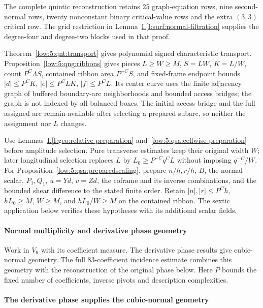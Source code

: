 \documentclass[11pt]{amsart}
\theoremstyle{definition}
\theoremstyle{remark}
\numberwithin{equation}{section}
\newcommand{\partIref}[1]{\hyperref[I:#1]{I.\ref*{I:#1}}}
\begin{document}
The complete quintic reconstruction retains $25$ graph-equation rows, nine second-normal rows, twenty nonconstant binary critical-value rows and the extra $(3,3)$ critical row. The grid restriction in Lemma~\partIref{surf:normal-filtration} supplies the degree-four and degree-two blocks used in that proof.

Theorem~\ref{low:5:qnt:transport} gives polynomial signed characteristic transport. Proposition~\ref{low:5:qng:ribbons} gives pieces $L\ge W\ge M$, $S=LW$, $K=L/W$, count $P^C\Lambda S$, contained ribbon area $P^{-C}S$, and fixed-frame endpoint bounds $|d|\le P^CK$, $|e|\le P^CLK$, $|f|\le P^CL$. Its center curve uses the finite adjacency graph of buffered boundary-arc neighborhoods and bounded access bridges; the graph is not indexed by all balanced boxes. The initial access bridge and the full assigned arc remain available after selecting a prepared subarc, so neither the assignment nor $L$ changes.

Use Lemmas~\partIref{geo:relative-preparation} and~\ref{low:5:qsa:cellwise-preparation} before amplitude selection. Pure transverse estimates keep their original width $W$; later longitudinal selection replaces $L$ by $L_0\ge P^{-C}q^CL$ without imposing $q^{-C}/W$. For Proposition~\ref{low:5:qsa:preparedscaling}, prepare $n/h,r/h$, $B$, the normal scalar, $P_1,Q_1$, $u=Yd$, $v=Zd$, the coframe and its inverse combinations, and the bounded shear difference to the stated finite order. Retain $|n|,|r|\le P^Ch$, $hL_0\ge M$, $W\ge M$, and $hL_0/W\ge M$ on the contained ribbon. The sextic application below verifies these hypotheses with its additional scalar fields.

\paragraph{Normal multiplicity and derivative phase geometry}

Work in $V_6$ with its coefficient measure. The derivative phase results give cubic-normal geometry. The full $83$-coefficient incidence estimate combines this geometry with the reconstruction of the original phase below. Here $P$ bounds the fixed number of coefficients, inverse pivots and description complexities.


\paragraph{The derivative phase supplies the cubic-normal geometry}
\end{document}
